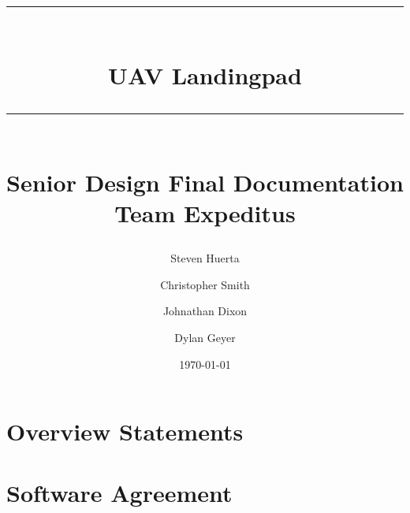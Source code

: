 \documentclass{book}
\title{{\color{SDColor3} \rule{\linewidth}{0.5mm}}\\[2mm] {\huge \bfseries \color{SDColor3} UAV Landingpad }\\[-1mm] {\color{SDColor3}\rule{\linewidth}{0.5mm}} \\  \vfill
{\LARGE \bfseries \color{SDColor4} Senior Design Final Documentation }\\  \vfill 
{\color{SDColor3} Team Expeditus} }
\author{\color{SDColor3}  Steven Huerta \and \color{SDColor3} Christopher Smith \and \color{SDColor3} Johnathan Dixon
\and \color{SDColor3} Dylan Geyer }
\date{\color{SDColor3} \today}
\begin{document}
\frontmatter

\maketitle
\tableofcontents
{}
\listoffigures

\chapter{Overview Statements}

 
\mainmatter




%
%


\agreement

\chapter{Software Agreement}


\end{document}
